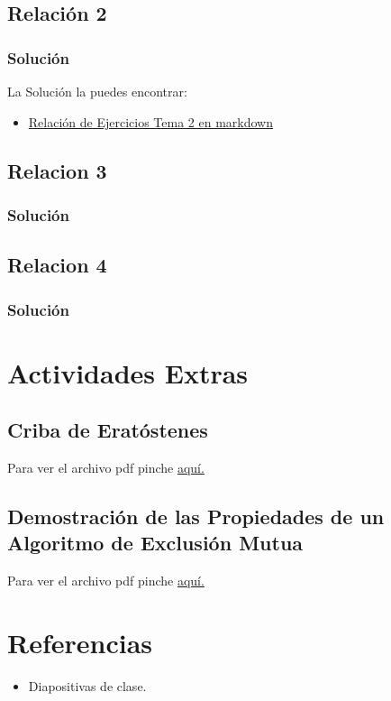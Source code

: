 \documentclass[a4paper,12pt]{article}
\begin{document}
\subsection{Relación 2}
\subsubsection{Solución}
La Solución la puedes encontrar:
\begin{itemize}
    \item \href{https://github.com/ElblogdeIsmael/ElblogdeIsmael.github.io/tree/main/Subjects/Third/SCD/Teoria/Tema2/RelacionEjerciciosTema2.md}{Relación de Ejercicios Tema 2 en markdown}
\end{itemize}

\subsection{Relacion 3}
\subsubsection{Solución}



\subsection{Relacion 4}
\subsubsection{Solución}


\section{Actividades Extras}
\subsection{Criba de Eratóstenes}
%
Para ver el archivo pdf pinche 
\href{https://github.com/ElblogdeIsmael/ElblogdeIsmael.github.io/blob/main/Subjects/Third/SCD/Teoria/Actividad_Extra/cribadeErastotenes/ETSIIT/build/Erastotenes.pdf}{aquí.}

\subsection{Demostración de las Propiedades de un Algoritmo de Exclusión Mutua}
Para ver el archivo pdf pinche 
\href{https://github.com/ElblogdeIsmael/ElblogdeIsmael.github.io/blob/main/Subjects/Third/SCD/Teoria/Actividad_Extra/Demostracion_Prop_ALG_EM/ETSIIT/build/Demostracion.pdf}{aquí.}

\newpage

\section{Referencias}
\begin{itemize}
    \item Diapositivas de clase.
\end{itemize}
\end{document}
